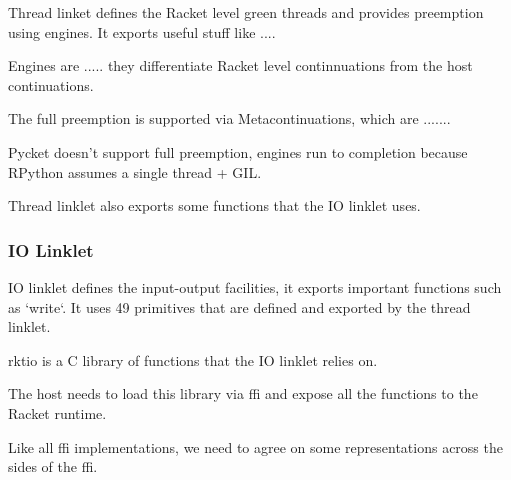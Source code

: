				\begin{paragraph-here}%
					Thread linket defines the Racket level green threads and provides preemption using engines. It exports useful stuff like ....
				\end{paragraph-here}

				\begin{paragraph-here}%
					Engines are ..... they differentiate Racket level continnuations from the host continuations.
				\end{paragraph-here}

				\begin{paragraph-here}%
					The full preemption is supported via Metacontinuations, which are .......
				\end{paragraph-here}

				\begin{paragraph-here}%
					Pycket doesn't support full preemption, engines run to completion because RPython assumes a single thread + GIL.
				\end{paragraph-here}

				\begin{paragraph-here}%
					Thread linklet also exports some functions that the IO linklet uses.
				\end{paragraph-here}

			\subsubsection{IO Linklet}

				\begin{paragraph-here}%
					IO linklet defines the input-output facilities, it exports important functions such as `write`. It uses 49 primitives that are defined and exported by the thread linklet.
				\end{paragraph-here}

				\begin{paragraph-here}%
					rktio is a C library of functions that the IO linklet relies on.
				\end{paragraph-here}

				\begin{paragraph-here}%
					The host needs to load this library via ffi and expose all the functions to the Racket runtime.
				\end{paragraph-here}

				\begin{paragraph-here}%
					Like all ffi implementations, we need to agree on some representations across the sides of the ffi.
				\end{paragraph-here}

